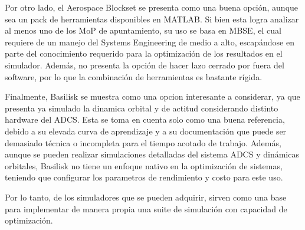 Por otro lado, el Aerospace Blockset se presenta como una buena opción, aunque sea un pack de herramientas disponibles en MATLAB. Si bien esta logra analizar al menos uno de los MoP de apuntamiento, su uso se basa en MBSE, el cual requiere de un manejo del Systems Engineering de medio a alto, escapándose en parte del conocimiento requerido para la optimización de los resultados en el simulador. Además, no presenta la opción de hacer lazo cerrado por fuera del software, por lo que la combinación de herramientas es bastante rígida.

Finalmente, Basilisk se muestra como una opcion interesante a considerar, ya que presenta ya simulado la dinamica orbital y de actitud considerando distinto hardware del \gls{ADCS}. Esta se toma en cuenta solo como una buena referencia, debido a su elevada curva de aprendizaje y a su documentación que puede ser demasiado técnica o incompleta para el tiempo acotado de trabajo. Además, aunque se pueden realizar simulaciones detalladas del sistema \gls{ADCS} y dinámicas orbitales, Basilisk no tiene un enfoque nativo en la optimización de sistemas, teniendo que configurar los parametros de rendimiento y costo para este uso.

Por lo tanto, de los simuladores que se pueden adquirir, sirven como una base para implementar de manera propia una suite de simulación con capacidad de optimización.
